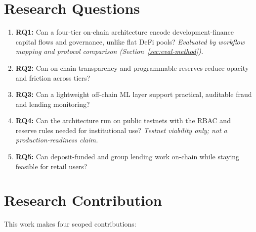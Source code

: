 \documentclass[12pt,a4paper]{report}
\begin{document}
\section{Research Questions}

\begin{enumerate}[noitemsep]
\item \textbf{RQ1:} Can a four-tier on-chain architecture encode development-finance capital flows and governance, unlike flat DeFi pools? \textit{Evaluated by workflow mapping and protocol comparison (Section~\ref{sec:eval-method}).}
\item \textbf{RQ2:} Can on-chain transparency and programmable reserves reduce opacity and friction across tiers?
\item \textbf{RQ3:} Can a lightweight off-chain ML layer support practical, auditable fraud and lending monitoring?
\item \textbf{RQ4:} Can the architecture run on public testnets with the RBAC and reserve rules needed for institutional use? \textit{Testnet viability only; not a production-readiness claim.}
\item \textbf{RQ5:} Can deposit-funded and group lending work on-chain while staying feasible for retail users?
\end{enumerate}

\section{Research Contribution}
\label{sec:research-contribution}

This work makes four scoped contributions:
\end{document}
